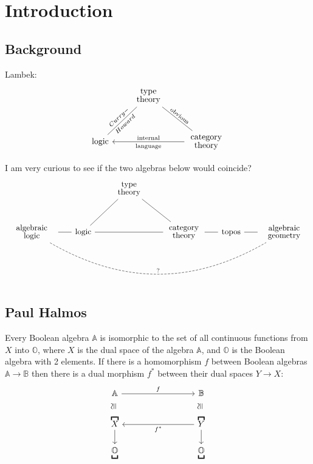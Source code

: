 \chapter{Introduction}\label{chap:introduction}

\section{Background}

Lambek:
\begin{equation}
\begin{tikzcd}[row sep=1cm, column sep=0.6cm]
& \parbox{1.5cm}{\linespread{-0.5}\selectfont\centering type theory} \arrow[dl,dash,"Curry-","Howard"',sloped] \arrow[dr,dash,"\text{obvious}",sloped] & \\
\mbox{logic} & {} & \parbox{1.5cm}{\linespread{-0.5}\selectfont\centering category theory} \arrow[ll,"\text{internal}"',"\text{language}"]
\end{tikzcd}
\end{equation}

I am very curious to see if the two algebras below would coincide?
\begin{equation}
\begin{tikzcd}[row sep=1cm, column sep=0.6cm]
 & & \parbox{1.5cm}{\linespread{-0.5}\selectfont\centering type theory} \arrow[dl,dash] \arrow[dr,dash] & & & \\
\parbox{2cm}{\linespread{-0.5}\selectfont\centering algebraic logic} \arrow[rrrrr, dashed, dash, bend right,"?"] \arrow[r,dash] & \mbox{logic} \arrow[rr,dash] & {} & \parbox{1.5cm}{\linespread{-0.5}\selectfont\centering category theory} \arrow[r,dash] & \mbox{topos} \arrow[r,dash] & \parbox{2cm}{\linespread{-0.5}\selectfont\centering algebraic geometry}
\end{tikzcd}
\end{equation}

\section{Paul Halmos}

Every Boolean algebra $\mathbb{A}$ is isomorphic to the set of all continuous functions from $X$ into $\mathbb{O}$, where $X$ is the dual space of the algebra $\mathbb{A}$, and $\mathbb{O}$ is the Boolean algebra with 2 elements.  If there is a homomorphism $f$ between Boolean algebras $\mathbb{A} \rightarrow \mathbb{B}$ then there is a dual morphism $f^*$ between their dual spaces $Y \rightarrow X$:
\begin{equation}
\begin{tikzcd}[column sep=3cm, row sep=0.6cm]
\mathbb{A} \arrow[r,"f"] \arrow[d,shift left=2,phantom,"\cong"{anchor=south,rotate=90}] & \mathbb{B} \arrow[d,shift left=2,phantom,"\cong"{anchor=south,rotate=90}] \\
\overbracket{X} \arrow[d] & \overbracket{Y} \arrow[d] \arrow[l,"f^*"] \\
\underbracket{\mathbb{O}} & \underbracket{\mathbb{O}} 
\end{tikzcd}
\end{equation}

